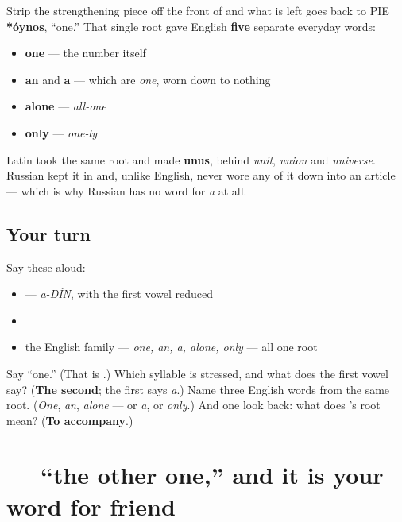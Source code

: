 \begin{cousinweb}
Strip the strengthening piece off the front of \textbf{} and what is left goes back to PIE \textbf{*óynos}, \textquotedblleft{}one.\textquotedblright{} That single root gave English \textbf{five} separate everyday words:

\begin{itemize}
\raggedright
  \item \textbf{one} — the number itself
  \item \textbf{an} and \textbf{a} — which are \emph{one}, worn down to nothing
  \item \textbf{alone} — \emph{all-one}
  \item \textbf{only} — \emph{one-ly}
\end{itemize}

Latin took the same root and made \textbf{unus}, behind \emph{unit}, \emph{union} and \emph{universe}. Russian kept it in \textbf{} and, unlike English, never wore any of it down into an article — which is why Russian has no word for \emph{a} at all.
\end{cousinweb}

\subsection*{Your turn}
Say these aloud:

\begin{itemize}
\raggedright
  \item \emph{} — \emph{a-DÍN}, with the first vowel reduced
  \item \emph{ }
  \item the English family — \emph{one, an, a, alone, only} — all one root
\end{itemize}

\begin{tcolorbox}[breakable,colback=teal!4,colframe=teal!35!black,title={Before you move on}]
Say \textquotedblleft{}one.\textquotedblright{} (That is \textbf{}.) Which syllable is stressed, and what does the first vowel say? (\textbf{The second}; the first \textbf{} says \emph{a}.) Name three English words from the same root. (\emph{One}, \emph{an}, \emph{alone} — or \emph{a}, or \emph{only}.) And one look back: what does \emph{}'s root mean? (\textbf{To accompany}.)
\end{tcolorbox}
\section[\texorpdfstring{\ru{другой} (drugóy)}{другой (drugóy)}]{ — \textquotedblleft{}the other one,\textquotedblright{} and it is your word for friend}

